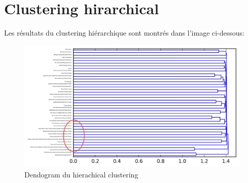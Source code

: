 	\section{Clustering hirarchical}
	Les résultats du clustering hiérarchique sont montrés dans l'image ci-dessous:
	\begin{figure}[h]
	  \centering
	    \includegraphics[width=0.6\linewidth]{img/clustering50_tf_idf.png}
	  \caption{Dendogram du hierachical clustering}
	  \label{hierarchical}
	\end{figure}
	
